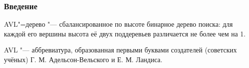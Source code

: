 \begin{frame}
    \frametitle{Введение}
    
    AVL"=дерево "--- сбалансированное по высоте бинарное дерево поиска:
    для каждой его вершины высота её двух поддеревьев различается не более чем на 1.

    AVL "--- аббревиатура, образованная первыми буквами создателей
    (советских учёных) Г. М. Адельсон-Вельского и Е. М. Ландиса.
\end{frame}